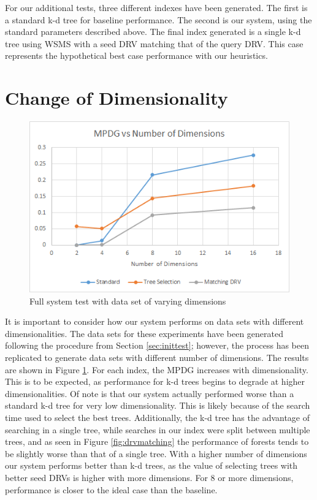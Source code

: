 For our additional tests, three different indexes have been generated.  The first is a standard k-d tree for baseline performance.  The second is our system, using the standard parameters described above.  The final index generated is a single k-d tree using WSMS with a seed DRV matching that of the query DRV.  This case represents the hypothetical best case performance with our heuristics.

\section{Change of Dimensionality}

\begin{figure}[h]
\begin{center}
\includegraphics[width=.85\textwidth]{Figures/dims}
\end{center}
\caption{Full system test with data set of varying dimensions}
\label{fig:dim}
\end{figure}

It is important to consider how our system performs on data sets with different dimensionalities.  The data sets for these experiments have been generated following the procedure from Section \ref{sec:inittest}; however, the process has been replicated to generate data sets with different number of dimensions.  The results are shown in Figure \ref{fig:dim}.  For each index, the MPDG increases with dimensionality.  This is to be expected, as performance for k-d trees begins to degrade at higher dimensionalities.  Of note is that our system actually performed worse than a standard k-d tree for very low dimensionality.  This is likely because of the search time used to select the best trees.  Additionally, the k-d tree has the advantage of searching in a single tree, while searches in our index were split between multiple trees, and as seen in Figure \ref{fig:drvmatching} the performance of forests tends to be slightly worse than that of a single tree.  With a higher number of dimensions our system performs better than k-d trees, as the value of selecting trees with better seed DRVs is higher with more dimensions.  For 8 or more dimensions, performance is closer to the ideal case than the baseline.

